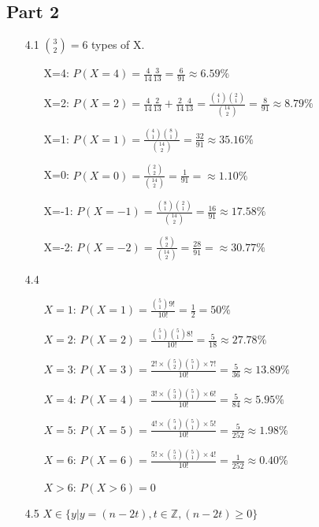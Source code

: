 \documentclass{article}
\begin{document}
\subsection*{Part 2}
\begin{itemize}
    \item [4.1] \(\binom{3}{2} = 6\) types of X.
    \begin{itemize}
        \item [X=4:] \(P(X=4)= \frac{4}{14}\frac{3}{13} = \frac{6}{91}\approx 6.59\%\)
        \item [X=2:] \(P(X=2)= \frac{4}{14}\frac{2}{13}+\frac{2}{14}\frac{4}{13} = \frac{\binom{4}{1}\binom{2}{1}}{\binom{14}{2}} = \frac{8}{91} \approx 8.79\%\)
        \item [X=1:] \(P(X=1)= \frac{\binom{4}{1}\binom{8}{1}}{\binom{14}{2}} = \frac{32}{91}\approx 35.16\%\)
        \item [X=0:] \(P(X=0)= \frac{\binom{2}{2}}{\binom{14}{2}}=\frac{1}{91}=\approx 1.10\%\)
        \item [X=-1:]\(P(X=-1)= \frac{\binom{8}{1}\binom{2}{1}}{\binom{14}{2}}=\frac{16}{91}\approx 17.58\%\)
        \item [X=-2:]\(P(X=-2)=\frac{\binom{8}{2}}{\binom{14}{2}}=\frac{28}{91}=\approx 30.77\%\)
    \end{itemize}
    \item [4.4] \ 
    \begin{itemize}
        \item [\(X=1\):] \(P(X=1) = \frac{\binom{5}{1}9!}{10!} = \frac{1}{2}=50\%\)
        \item [\(X=2\):] \(P(X=2) = \frac{\binom{5}{1}\binom{5}{1}8!}{10!} = \frac{5}{18}\approx27.78\%\)
        \item [\(X=3\):] \(P(X=3) = \frac{2!\times \binom{5}{2}\binom{5}{1}\times 7!}{10!}=\frac{5}{36} \approx 13.89\%\)
        \item [\(X=4\):] \(P(X=4) = \frac{3!\times \binom{5}{3}\binom{5}{1}\times 6!}{10!}=\frac{5}{84} \approx 5.95\%\)
        \item [\(X=5\):] \(P(X=5) = \frac{4!\times \binom{5}{4}\binom{5}{1}\times 5!}{10!}=\frac{5}{252} \approx 1.98\%\)
        \item [\(X=6\):] \(P(X=6) = \frac{5!\times \binom{5}{5}\binom{5}{1}\times 4!}{10!}=\frac{1}{252} \approx 0.40\%\)
        \item [\(X>6\):] \(P(X>6) = 0\)
    \end{itemize}
    \item [4.5] \(X\in\{y|y=(n-2t),t\in\mathbb{Z},(n-2t)\geqslant0\}\)
\end{itemize}
\end{document}
